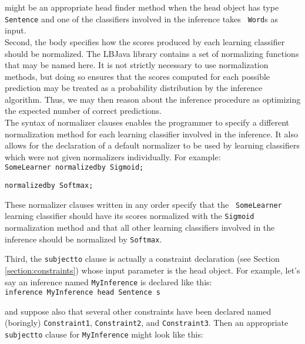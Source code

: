 \noindent
might be an appropriate head finder method when the head object has type {\tt
Sentence} and one of the classifiers involved in the inference takes {\tt
Word}s as input. \\

Second, the body specifies how the scores produced by each learning classifier
should be normalized.  The LBJava library contains a set of normalizing functions
that may be named here.  It is not strictly necessary to use normalization
methods, but doing so ensures that the scores computed for each possible
prediction may be treated as a probability distribution by the inference
algorithm.  Thus, we may then reason about the inference procedure as
optimizing the expected number of correct predictions. \\

The syntax of normalizer clauses enables the programmer to specify a different
normalization method for each learning classifier involved in the inference.
It also allows for the declaration of a default normalizer to be used
by learning classifiers which were not given normalizers individually.  For
example: \\

\vspace{-.25cm}
{\tt SomeLearner normalizedby Sigmoid;}

{\tt normalizedby Softmax;} \\
\vspace{-.25cm}

\noindent
These normalizer clauses written in any order specify that the {\tt
SomeLearner} learning classifier should have its scores normalized with the
{\tt Sigmoid} normalization method and that all other learning classifiers
involved in the inference should be normalized by {\tt Softmax}.

Third, the {\tt subjectto} clause is actually a constraint declaration
(see Section \ref{section:constraints}) whose input parameter is the head
object.  For example, let's say an inference named {\tt MyInference} is
declared like this: \\

\vspace{-.25cm}
{\tt inference MyInference head Sentence s} \\
\vspace{-.25cm}

\noindent
and suppose also that several other constraints have been declared named
(boringly) {\tt Constraint1}, {\tt Constraint2}, and {\tt Constraint3}.
Then an appropriate {\tt subjectto} clause for {\tt MyInference} might look
like this: \\

